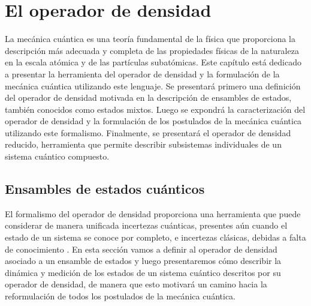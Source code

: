 \chapter{El operador de densidad} %

La mecánica cuántica es una teoría fundamental de la física que
proporciona la descripción más adecuada y completa de las propiedades
físicas de la naturaleza en la escala atómica y de las partículas 
subatómicas. Este capítulo está dedicado a presentar la herramienta
del operador de densidad y la formulación de la mecánica cuántica 
utilizando este lenguaje. Se presentará primero una definición
del operador de densidad motivada en la descripción de ensambles
de estados, también conocidos como estados mixtos. Luego
se expondrá la caracterización del operador de densidad y la 
formulación de los postulados de la mecánica cuántica utilizando este
formalismo. Finalmente, se presentará el 
operador de densidad reducido, herramienta que permite 
describir subsistemas individuales de un sistema cuántico compuesto.

\section{Ensambles de estados cuánticos} %
El formalismo del operador de densidad proporciona una herramienta
que puede considerar de manera unificada incertezas cuánticas, 
presentes aún cuando el estado de un sistema se conoce 
por completo, e incertezas clásicas, 
debidas a falta de conocimiento \cite{sakurai2010modern}.
En esta sección vamos a definir al operador de densidad asociado a 
un ensamble de estados y luego presentaremos cómo describir la dinámica
y medición de los estados de un sistema cuántico descritos por su operador
de densidad, de manera que esto motivará un camino hacia la reformulación
de todos los postulados de la mecánica cuántica.

